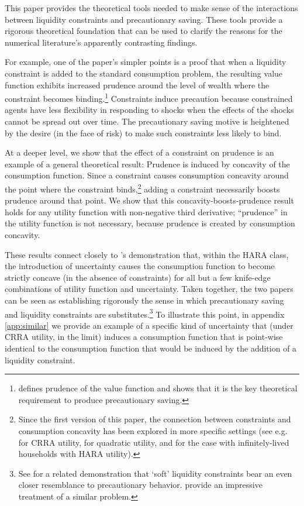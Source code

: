 \documentclass[titlepage]{\econtex}
\renewcommand{\cite}{\citeyear}
\begin{document}
This paper provides the theoretical tools needed to make sense of the interactions between liquidity constraints and precautionary saving. These tools provide a rigorous theoretical foundation that can be used to clarify the reasons for the numerical literature's apparently contrasting findings.

For example, one of the paper's simpler points is a proof that when a liquidity constraint is added to the standard consumption problem, the resulting value function exhibits increased prudence around the level of wealth where the constraint becomes binding.\footnote{\citet{kimball:smallandlarge} defines prudence of the value function and shows that it is the key theoretical requirement to produce precautionary saving.}  %
Constraints induce precaution because constrained agents have less flexibility in responding to shocks when the effects of the shocks cannot be spread out over time. The precautionary saving motive is heightened by the desire (in the face of risk) to make such constraints less likely to bind.

At a deeper level, we show that the effect of a constraint on prudence is an example of a general theoretical result: Prudence is induced by concavity of the consumption function. Since a constraint causes consumption concavity around the point where the constraint binds,\footnote{Since the first version of this paper, the connection between constraints and consumption concavity has been explored in more specific settings (see e.g. \citet{park2006analytical} for CRRA utility,  \citet{nishiyama2012concavity} for quadratic utility, and \citet{holm2018consumption} for the case with infinitely-lived households with HARA utility).} adding a constraint necessarily boosts prudence around that point. We show that this concavity-boosts-prudence result holds for any utility function with non-negative third derivative; ``prudence'' in the utility function \cite{kimball:smallandlarge} is not necessary, because prudence is created by consumption concavity.

These results connect closely to \citet{carroll&kimball:concavity}'s demonstration that, within the HARA class, the introduction of uncertainty causes the consumption function to become strictly concave (in the absence of constraints) for all but a few knife-edge combinations of utility function and uncertainty.  Taken together, the two papers can be seen as establishing rigorously the sense in which precautionary saving and liquidity  constraints are substitutes.\footnote{See \citet{fernandez-corugedo:softlc} for a related demonstration that `soft' liquidity constraints bear an even closer resemblance to precautionary behavior. \citet{MendelsonAmihud:consumption} provide an impressive treatment of a similar problem.} To illustrate this point, in appendix \ref{app:similar} we provide an example of a specific kind of uncertainty that (under CRRA utility, in the limit) induces a consumption function that is point-wise identical to the consumption function that would be induced by the addition of a liquidity constraint.
\end{document}
